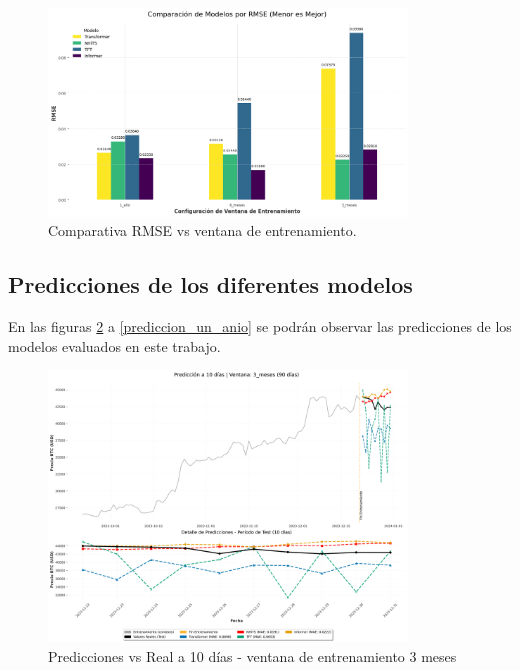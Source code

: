 \documentclass[12pt]{article}
\begin{document}
\begin{figure}[H] 
\centering
\includegraphics[width=0.85\textwidth]{./results/comparacion_modelos_por_RMSE.png} 
\caption{Comparativa RMSE vs ventana de entrenamiento.}
\label{rmse}
\end{figure}


\subsection{Predicciones de los diferentes modelos}

En las figuras \ref{prediccion_tres_meses} a \ref{prediccion_un_anio} se podrán observar las predicciones de los modelos evaluados en este trabajo.

\begin{figure}[H] 
\centering
\includegraphics[width=0.85\textwidth]{./results/prediccion_bitcoin_3_meses_10dias.png} 
\caption{Predicciones vs Real a 10 días - ventana de entrenamiento 3 meses}
\label{prediccion_tres_meses}
\end{figure}
\end{document}
